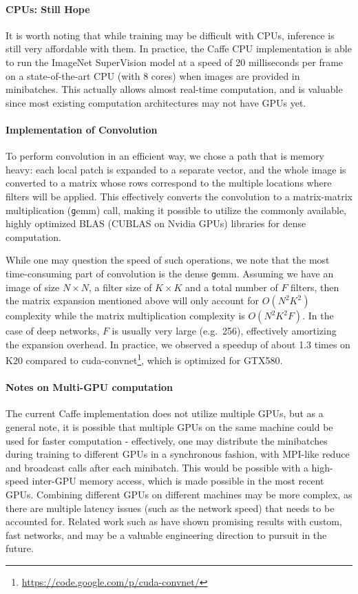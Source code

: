 \paragraph{CPUs: Still Hope} It is worth noting that while training may be difficult with CPUs, inference is still very affordable with them. In practice, the Caffe CPU implementation is able to run the ImageNet SuperVision model at a speed of 20 milliseconds per frame on a state-of-the-art CPU (with 8 cores) when images are provided in minibatches. This actually allows almost real-time computation, and is valuable since most existing computation architectures may not have GPUs yet.

\paragraph{Implementation of Convolution} To perform convolution in an efficient way, we chose a path that is memory heavy: each local patch is expanded to a separate vector, and the whole image is converted to a matrix whose rows correspond to the multiple locations where filters will be applied. This effectively converts the convolution to a matrix-matrix multiplication ({\texttt gemm}) call, making it possible to utilize the commonly available, highly optimized BLAS (CUBLAS on Nvidia GPUs) libraries for dense computation.

While one may question the speed of such operations, we note that the most time-consuming part of convolution is the dense {\texttt gemm}. Assuming we have an image of size $N\times N$, a filter size of $K\times K$ and a total number of 
$F$ filters, then the matrix expansion mentioned above will only account for $O(N^2K^2)$ complexity while the matrix multiplication complexity is $O(N^2K^2F)$. In the case of deep networks, $F$ is usually very large (e.g.\ 256), effectively amortizing the expansion overhead. In practice, we observed a speedup of about 1.3 times on K20 compared to cuda-convnet\footnote{\url{https://code.google.com/p/cuda-convnet/}}, which is optimized for GTX580.

\paragraph{Notes on Multi-GPU computation} The current Caffe implementation does not utilize multiple GPUs, but as a general note, it is possible that multiple GPUs on the same machine could be used for faster computation - effectively, one may distribute the minibatches during training to different GPUs in a synchronous fashion, with MPI-like reduce and broadcast calls after each minibatch. This would be possible with a high-speed inter-GPU memory access, which is made possible in the most recent GPUs. Combining different GPUs on different machines may be more complex, as there are multiple latency issues (such as the network speed) that needs to be accounted for. Related work such as \cite{coates2013deep} have shown promising results with custom, fast networks, and may be a valuable engineering direction to pursuit in the future.


